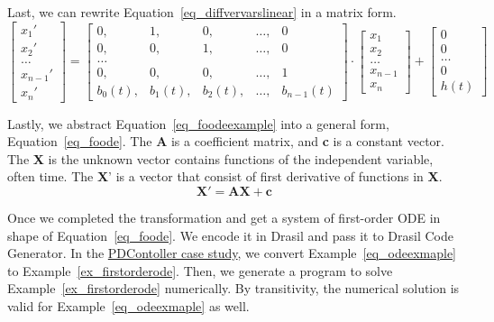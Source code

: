Last, we can rewrite Equation~\ref{eq_diffvervarslinear} in a matrix form.
\begin{equation} \label{eq_foodeexample}
	\begin{bmatrix}
		x_{1}' \\
    x_{2}' \\
    \dots  \\
    x_{n-1}' \\
    x_{n}'
	\end{bmatrix}
    = 
  \begin{bmatrix}
		0, & 1, & 0, & \dots, & 0 \\
    0, & 0, & 1, & \dots, & 0 \\
    \dots \\
    0, & 0, & 0, & \dots, & 1 \\
    b_{0}(t), & b_{1}(t), & b_{2}(t), & \dots, & b_{n-1}(t)
	\end{bmatrix}
    \cdot
  \begin{bmatrix}
		x_{1} \\
    x_{2} \\
    \dots  \\
    x_{n-1} \\
    x_{n}
	\end{bmatrix}
    + 
  \begin{bmatrix}
    0 \\
    0 \\
    \dots  \\
    0 \\
    h(t)
	\end{bmatrix}
\end{equation}

Lastly, we abstract Equation~\ref{eq_foodeexample} into a general form, Equation~\ref{eq_foode}. The \textbf{A} is a coefficient matrix, and \textbf{c} is a constant vector. The \textbf{X} is the unknown vector contains functions of the independent variable, often time. The \textbf{X}' is a vector that consist of first derivative of functions in \textbf{X}.
\begin{equation} \label{eq_foode}
    \boldsymbol{X}' = \boldsymbol{AX} + \boldsymbol{c}
\end{equation}

Once we completed the transformation and get a system of first-order ODE in shape of Equation~\ref{eq_foode}. We encode it in Drasil and pass it to Drasil Code Generator. In the \href{https://jacquescarette.github.io/Drasil/examples/pdcontroller/SRS/srs/PDController_SRS.html#Sec:IMs}{PDContoller case study}, we convert Example~\ref{eq_odeexmaple} to Example~\ref{ex_firstorderode}. Then, we generate a program to solve Example~\ref{ex_firstorderode} numerically. By transitivity, the numerical solution is valid for Example~\ref{eq_odeexmaple} as well.


